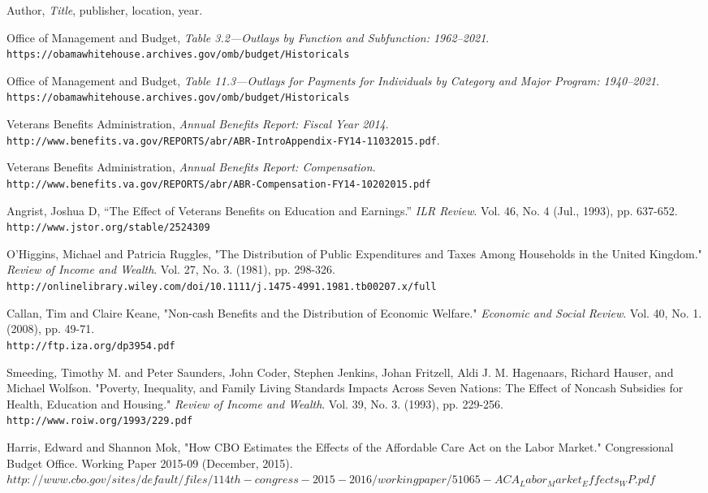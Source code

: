 \documentclass{article}
\begin{document}
\newpage
\begin{thebibliography}{1}

 Author, \textit{Title}, publisher, location, year.

 Office of Management and Budget, \textit{Table 3.2—Outlays by Function and Subfunction: 1962–2021}.\\ \texttt{https://obamawhitehouse.archives.gov/omb/budget/Historicals}

 Office of Management and Budget, \textit{Table 11.3—Outlays for Payments for Individuals by Category and Major Program: 1940–2021}.\\ \texttt{https://obamawhitehouse.archives.gov/omb/budget/Historicals}

 Veterans Benefits Administration, \textit{Annual Benefits Report: Fiscal Year 2014}.\\ \texttt{http://www.benefits.va.gov/REPORTS/abr/ABR-IntroAppendix-FY14-11032015.pdf}.

 Veterans Benefits Administration, \textit{Annual Benefits Report: Compensation}.\\ \texttt{http://www.benefits.va.gov/REPORTS/abr/ABR-Compensation-FY14-10202015.pdf}

 Angrist, Joshua D, “The Effect of Veterans Benefits on Education and Earnings.” \textit{ILR Review}. Vol. 46, No. 4 (Jul., 1993), pp. 637-652.\\ \texttt{http://www.jstor.org/stable/2524309}

 O'Higgins, Michael and Patricia Ruggles, "The Distribution of Public Expenditures and Taxes Among Households in the United Kingdom." \textit{Review of Income and Wealth}. Vol. 27, No. 3. (1981), pp. 298-326.\\ \texttt{http://onlinelibrary.wiley.com/doi/10.1111/j.1475-4991.1981.tb00207.x/full}

 Callan, Tim and Claire Keane, "Non-cash Benefits and the Distribution of Economic Welfare." \textit{Economic and Social Review}. Vol. 40, No. 1. (2008), pp. 49-71.\\ \texttt{http://ftp.iza.org/dp3954.pdf} 

 Smeeding, Timothy M. and Peter Saunders, John Coder, Stephen Jenkins, Johan Fritzell, Aldi J. M. Hagenaars, Richard Hauser, and Michael Wolfson. "Poverty, Inequality, and Family Living Standards Impacts Across Seven Nations: The Effect of Noncash Subsidies for Health, Education and Housing." \textit{Review of Income and Wealth}. Vol. 39, No. 3. (1993), pp. 229-256.\\ \texttt{http://www.roiw.org/1993/229.pdf}

 Harris, Edward and Shannon Mok, "How CBO Estimates the Effects of the Affordable Care Act on the Labor Market." Congressional Budget Office. Working Paper 2015-09 (December, 2015).\\ 
\texttt{$http://www.cbo.gov/sites/default/files/114th-congress-2015-2016/workingpaper/51065-ACA_Labor_Market_Effects_WP.pdf$}

\end{thebibliography}
 
\end{document}
